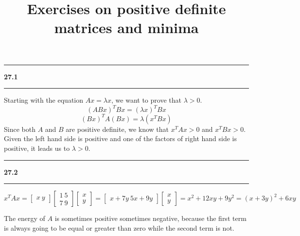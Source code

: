 \documentclass[11pt]{article}
\newcommand\question[2]{\vspace{.25in}\hrule\textbf{#1 #2}\vspace{.5em}\hrule\vspace{.10in}}
\begin{document}
\raggedright
\newcommand\NAME{Haiying Cui}  %
\newcommand\ANDREWID{Christy}     %
\newcommand\HWNUM{27}              %

\title{Exercises on positive definite matrices and minima}
\maketitle

\question{27.1}{}
Starting with the equation \(Ax = \lambda x\), we want to prove that \(\lambda > 0\).
$$(ABx)^TBx = (\lambda x)^TBx$$
$$(Bx)^TA(Bx) = \lambda (x^TBx)$$
Since both \(A\) and \(B\) are positive definite, we know that \(x^TAx > 0\) and \(x^TBx > 0\). Given the left hand side is positive and one of the factors of right hand side is positive, it leads us to \(\lambda > 0\).

\question{27.2}{}
$$x^TAx = \begin{bmatrix} x \ y \end{bmatrix}\begin{bmatrix} 1 \ 5 \\ 7 \ 9 \end{bmatrix}\begin{bmatrix} x \\ y \end{bmatrix} =  \begin{bmatrix} x+7y \ 5x+9y \end{bmatrix} \begin{bmatrix} x \\ y \end{bmatrix} = x^2 + 12xy + 9y^2 = (x+3y)^2 +6xy$$

The energy of \(A\) is sometimes positive sometimes negative, because the first term is always going to be equal or greater than zero while the second term is not.
\end{document}

